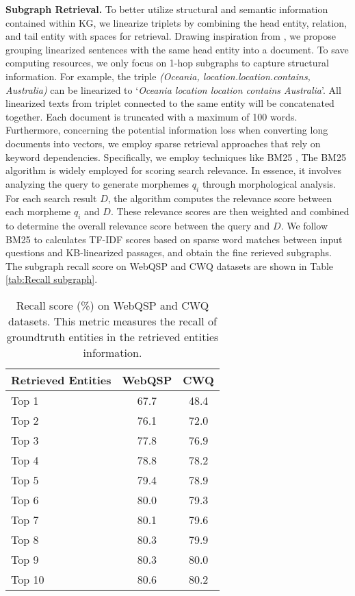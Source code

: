\textbf{Subgraph Retrieval.}
To better utilize structural and semantic information contained within KG, we linearize triplets by combining the head entity, relation, and tail entity with spaces for retrieval. Drawing inspiration from \cite{decaf}, we propose grouping linearized sentences with the same head entity into a document. To save computing resources, we only focus on 1-hop subgraphs to capture structural information. For example, the triple \textit{(Oceania, location.location.contains, Australia)} can be linearized to `\textit{Oceania location location contains Australia}'.  All linearized texts from triplet connected to the same entity will be concatenated together. Each document is truncated with a maximum of 100 words.
Furthermore, concerning the potential information loss when converting long documents into vectors, we employ sparse retrieval approaches that rely on keyword dependencies. Specifically, we employ techniques like BM25 \cite{robertson2009probabilistic}, The BM25 algorithm is widely employed for scoring search relevance. In essence, it involves analyzing the query to generate morphemes $q_i$ through morphological analysis. For each search result $D$, the algorithm computes the relevance score between each morpheme $q_i$ and $D$. These relevance scores are then weighted and combined to determine the overall relevance score between the query and $D$.
 We follow BM25 to calculates TF-IDF scores based on sparse word matches between input questions and KB-linearized passages, and obtain the fine rerieved subgraphs.
The subgraph recall score on WebQSP and CWQ datasets are shown in Table \ref{tab:Recall subgraph}.


\begin{table}[t]
\centering
\begin{tabular}{lcc}
\toprule
Retrieved Entities & WebQSP  & CWQ  \\
\midrule 
Top 1 &67.7 &48.4 \\
Top 2 &76.1 &72.0 \\
Top 3 &77.8 &76.9 \\
Top 4 &78.8 &78.2 \\
Top 5 &79.4 &78.9 \\
Top 6 &80.0 &79.3 \\
Top 7 &80.1 &79.6 \\
Top 8 &80.3 &79.9 \\
Top 9 &80.3 &80.0 \\
Top 10 &80.6 &80.2 \\
\bottomrule 
\end{tabular}
\caption{Recall score (\%) on WebQSP and CWQ datasets. This metric measures the recall of groundtruth entities in the retrieved entities information.
}
\label{tab:Recall entity}
\end{table}

